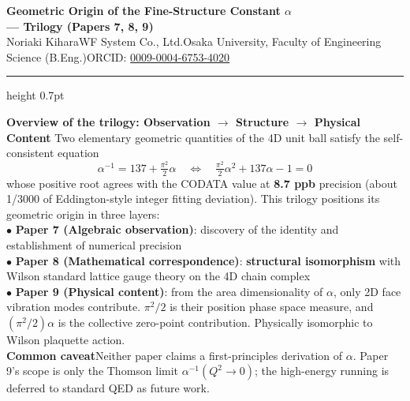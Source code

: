 \documentclass[9pt,a4paper]{article}
\begin{document}
\begin{center}
{\Large\bfseries Geometric Origin of the Fine-Structure Constant $\alpha$\\ --- Trilogy (Papers 7, 8, 9)}\\[2pt]
{\small Noriaki Kihara\enspace WF System Co., Ltd.\enspace Osaka University, Faculty of Engineering Science (B.Eng.)\enspace ORCID: \href{https://orcid.org/0009-0004-6753-4020}{0009-0004-6753-4020}}
\end{center}

\vspace{-1pt}
\hrule height 0.7pt
\vspace{4pt}

\begin{tcolorbox}[colback=gray!7,colframe=gray!55,boxrule=0.4pt,arc=2pt,left=4pt,right=4pt,top=2pt,bottom=2pt]
{\small
\textbf{Overview of the trilogy: Observation $\to$ Structure $\to$ Physical Content}\enspace
Two elementary geometric quantities of the 4D unit ball satisfy the self-consistent equation
\[ \alpha^{-1} = 137 + \tfrac{\pi^2}{2}\alpha \quad\Longleftrightarrow\quad \tfrac{\pi^2}{2}\alpha^2 + 137\alpha - 1 = 0 \]
whose positive root agrees with the CODATA value at \textbf{8.7 ppb} precision (about 1/3000 of Eddington-style integer fitting deviation). This trilogy positions its geometric origin in three layers:\\[1pt]
$\bullet$ \textbf{Paper 7 (Algebraic observation)}: discovery of the identity and establishment of numerical precision\\
$\bullet$ \textbf{Paper 8 (Mathematical correspondence)}: \textbf{structural isomorphism} with Wilson standard lattice gauge theory on the 4D chain complex\\
$\bullet$ \textbf{Paper 9 (Physical content)}: from the area dimensionality of $\alpha$, only 2D face vibration modes contribute. $\pi^2/2$ is their position phase space measure, and $(\pi^2/2)\alpha$ is the collective zero-point contribution. Physically isomorphic to Wilson plaquette action.\\[1pt]
\textbf{Common caveat}\enspace Neither paper claims a first-principles derivation of $\alpha$. Paper 9's scope is only the Thomson limit $\alpha^{-1}(Q^2 \to 0)$; the high-energy running is deferred to standard QED as future work.}
\end{tcolorbox}

\vspace{2pt}
\end{document}
